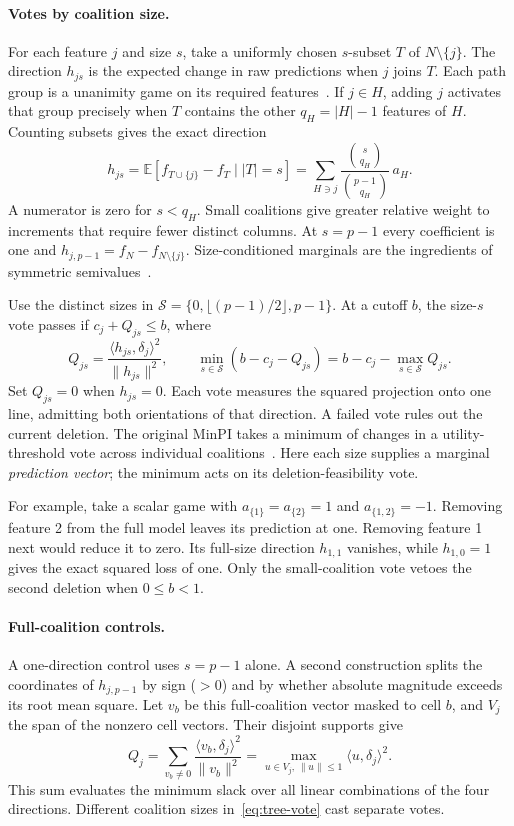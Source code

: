 \paragraph{Votes by coalition size.}
For each feature $j$ and size $s$, take a uniformly chosen $s$-subset $T$
of $N\setminus\{j\}$. The direction $h_{js}$ is the expected change in raw
predictions when $j$ joins $T$. Each path group is a unanimity game on its
required features~\citep{shapley1953value}. If $j\in H$, adding $j$ activates
that group precisely when $T$ contains the other $q_H=|H|-1$ features of $H$.
Counting subsets gives the exact direction
\begin{equation}
 h_{js}=\mathbb E[f_{T\cup\{j\}}-f_T\mid |T|=s]
       =\sum_{H\ni j}\frac{\binom{s}{q_H}}{\binom{p-1}{q_H}}\,a_H .
 \label{eq:tree-size}
\end{equation}
A numerator is zero for $s<q_H$. Small coalitions give greater relative weight
to increments that require fewer distinct columns. At $s=p-1$ every coefficient is one and
$h_{j,p-1}=f_N-f_{N\setminus\{j\}}$. Size-conditioned marginals are the
ingredients of symmetric semivalues~\citep{dubey1981semivalues}.

Use the distinct sizes in $\mathcal S=\{0,\lfloor(p-1)/2\rfloor,p-1\}$.
At a cutoff $b$, the size-$s$ vote passes if $c_j+Q_{js}\le b$, where
\begin{equation}
 Q_{js}=\frac{\langle h_{js},\delta_j\rangle^2}{\|h_{js}\|^2},\qquad
 \min_{s\in\mathcal S}(b-c_j-Q_{js})=b-c_j-\max_{s\in\mathcal S}Q_{js}.
 \label{eq:tree-vote}
\end{equation}
Set $Q_{js}=0$ when $h_{js}=0$. Each vote measures the squared projection onto
one line, admitting both orientations of that direction. A failed vote rules
out the current deletion. The original MinPI takes a minimum of changes in a
utility-threshold vote across individual coalitions~\citep{shi2026minpi}. Here
each size supplies a marginal \emph{prediction vector}; the minimum acts on
its deletion-feasibility vote.

For example, take a scalar game with $a_{\{1\}}=a_{\{2\}}=1$ and
$a_{\{1,2\}}=-1$. Removing feature 2 from the full model leaves its prediction
at one. Removing feature 1 next would reduce it to zero. Its full-size direction
$h_{1,1}$ vanishes, while $h_{1,0}=1$ gives the exact squared loss of one.
Only the small-coalition vote vetoes the second deletion when $0\le b<1$.

\paragraph{Full-coalition controls.}
A one-direction control uses $s=p-1$ alone. A second construction splits the
coordinates of $h_{j,p-1}$ by sign ($>0$) and by whether absolute magnitude
exceeds its root mean square. Let $v_b$ be this full-coalition vector masked
to cell $b$, and $V_j$ the span of the nonzero cell vectors. Their disjoint
supports give
\[
 Q_j=\sum_{v_b\ne0}\frac{\langle v_b,\delta_j\rangle^2}{\|v_b\|^2}
     = \max_{u\in V_j,\,\|u\|\le1}\langle u,\delta_j\rangle^2 .
\]
This sum evaluates the minimum slack over all linear combinations of the four
directions. Different coalition sizes in~\eqref{eq:tree-vote} cast separate
votes.

